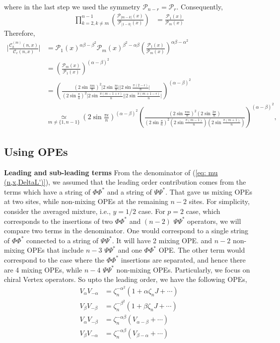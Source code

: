 \documentclass[11pt]{article}
\newcommand{\ep}{\epsilon}
\newcommand{\lb}{\left(}
\newcommand{\rb}{\right)}
\begin{document}
where in the last step we used the symmetry $\mathcal{P}_{n-r} = \mathcal{P}_r$.
Consequently,
\begin{align}
    \prod_{k = 2, k\neq m}^{n-1} \lb\frac{\mathcal{P}_{|m-k|}(x)}{\mathcal{P}_{|1-k|}(x)}\rb &= \frac{\mathcal{P}_1(x)}{\mathcal{P}_m(x)}
\end{align}
Therefore,
\begin{align}
    \Bigg|\frac{\mathcal{C}_b^{(m)}(n,x)
    }{\mathcal{C}_c(n,x)}\Bigg| &= \mathcal{P}_1(x)^{\alpha\beta-\beta^2} \mathcal{P}_m(x)^{\beta^2-\alpha\beta} \lb \frac{\mathcal{P}_1(x)}{\mathcal{P}_m(x)} \rb^{\alpha\beta - \alpha^2}\\
    &= \lb \frac{\mathcal{P}_m(x)}{\mathcal{P}_1(x)} \rb^{(\alpha-\beta)^2} \\
    &= \lb\frac{\lb2\sin \frac{\pi m}{n}\rb^2 \big|2\sin \frac{\pi \ep}{n}\big| \big|2\sin \frac{\pi (2-\ep)}{n}\big|}{\lb2\sin \frac{\pi }{n}\rb^2 \big|2\sin \frac{\pi (m-1+\ep)}{n}\big|\big|2\sin \frac{\pi (m+1-\ep)}{n}\big|}\rb^{(\alpha-\beta)^2} \\
    &\underset{m\neq \{1,n-1\}}{\simeq}\lb2\sin \frac{\pi \ep}{n}\rb^{(\alpha-\beta)^2}\lb\frac{\lb2\sin \frac{\pi m}{n}\rb^2  \lb 2\sin \frac{2\pi }{n}\rb}{\lb2\sin \frac{\pi }{n}\rb^2 \lb2\sin \frac{\pi (m-1)}{n}\rb\lb2\sin \frac{\pi (m+1)}{n}\rb}\rb^{(\alpha-\beta)^2}, 
\end{align}



\subsection{Using OPEs}
\textbf{Leading and sub-leading terms}
From the denominator of (\ref{eq: mu (n,x,DeltaL')}), we assumed that the leading order contribution comes from the terms which have a string of $\Phi \Phi^*$ and a string of $\Psi \Psi^*$. That gave us mixing OPEs at two sites, while non-mixing OPEs at the remaining $n-2$ sites. For simplicity, consider the averaged mixture, i.e., $y=1/2$ case. For $p=2$ case, which corresponds to the insertions of two $\Phi \Phi^*$ and  $(n-2)$ $\Psi \Psi^*$ operators, we will compare two terms in the denominator. One would correspond to a single string of $\Phi \Phi^*$ connected to a string of $\Psi \Psi^*$. It will have 2 mixing OPE. and $n-2$ non-mixing OPEs that include $n-3$ $\Psi \Psi^*$ and one $\Phi \Phi^*$ OPE. The other term would correspond to the case where the $\Phi \Phi^*$ insertions are separated, and hence there are 4 mixing OPEs, while $n-4$ $\Psi \Psi^*$ non-mixing OPEs. Particularly, we focus on chiral Vertex operators. So upto the leading order, we have the following OPEs,
\begin{align}
    V_\alpha V_{-\alpha} &= \zeta_n^{-\alpha^2} \lb  1 + \alpha \zeta_n J + \cdots\rb \\
    V_\beta V_{-\beta} &= \zeta_n^{-\beta^2} \lb  1 + \beta \zeta_n J + \cdots\rb \\
    V_\alpha V_{-\beta} &= \zeta_n^{-\alpha\beta} \lb  V_{\alpha - \beta} + \cdots\rb \\
    V_\beta V_{-\alpha} &= \zeta_n^{-\alpha\beta} \lb  V_{\beta - \alpha} + \cdots\rb
\end{align}
\end{document}
